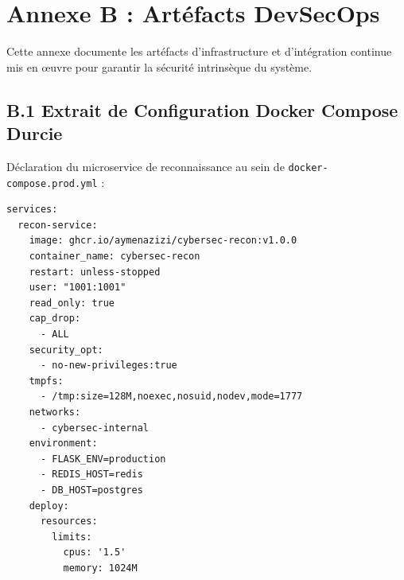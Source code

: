 \clearpage

\chapter*{Annexe B : Art\'efacts DevSecOps}

\par Cette annexe documente les art\'efacts d'infrastructure et d'int\'egration continue mis en \oe uvre pour garantir la s\'ecurit\'e intrins\`eque du syst\`eme.

\section*{B.1 Extrait de Configuration Docker Compose Durcie}
\par D\'eclaration du microservice de reconnaissance au sein de \texttt{docker-compose.prod.yml} :
{\footnotesize
\begin{verbatim}
services:
  recon-service:
    image: ghcr.io/aymenazizi/cybersec-recon:v1.0.0
    container_name: cybersec-recon
    restart: unless-stopped
    user: "1001:1001"
    read_only: true
    cap_drop:
      - ALL
    security_opt:
      - no-new-privileges:true
    tmpfs:
      - /tmp:size=128M,noexec,nosuid,nodev,mode=1777
    networks:
      - cybersec-internal
    environment:
      - FLASK_ENV=production
      - REDIS_HOST=redis
      - DB_HOST=postgres
    deploy:
      resources:
        limits:
          cpus: '1.5'
          memory: 1024M
\end{verbatim}
}

